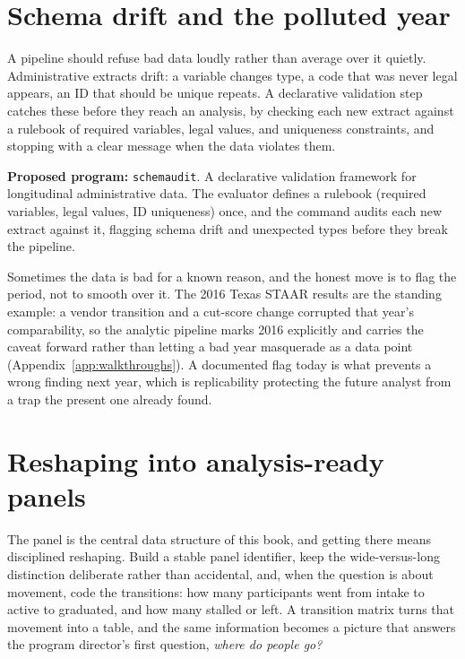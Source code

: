 \documentclass[
    a4paper,
    fontsize=10pt,
    twoside=true,
    numbers=noenddot,
]{kaobook}
\begin{document}
\section{Schema drift and the polluted year}
A pipeline should refuse bad data loudly rather than average over it quietly. Administrative extracts drift: a variable changes type, a code that was never legal appears, an ID that should be unique repeats. A declarative validation step catches these before they reach an analysis, by checking each new extract against a rulebook of required variables, legal values, and uniqueness constraints, and stopping with a clear message when the data violates them.

\begin{kaobox}[frametitle=Ado-file Idea: \texttt{schemaudit}]
\textbf{Proposed program:} \texttt{schemaudit}. A declarative validation framework for longitudinal administrative data. The evaluator defines a rulebook (required variables, legal values, ID uniqueness) once, and the command audits each new extract against it, flagging schema drift and unexpected types before they break the pipeline.
\end{kaobox}

Sometimes the data is bad for a known reason, and the honest move is to flag the period, not to smooth over it. The 2016 Texas STAAR results are the standing example: a vendor transition and a cut-score change corrupted that year's comparability, so the analytic pipeline marks 2016 explicitly and carries the caveat forward rather than letting a bad year masquerade as a data point (Appendix~\ref{app:walkthroughs}). A documented flag today is what prevents a wrong finding next year, which is replicability protecting the future analyst from a trap the present one already found.

\section{Reshaping into analysis-ready panels}
The panel is the central data structure of this book, and getting there means disciplined reshaping. Build a stable panel identifier, keep the wide-versus-long distinction deliberate rather than accidental, and, when the question is about movement, code the transitions: how many participants went from intake to active to graduated, and how many stalled or left. A transition matrix turns that movement into a table, and the same information becomes a picture that answers the program director's first question, \emph{where do people go?}
\end{document}
